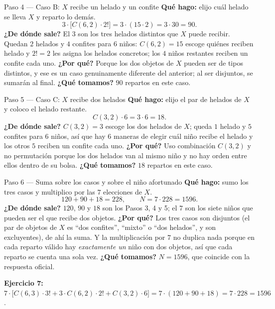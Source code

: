 \documentclass[11pt]{article}
\begin{document}
\begin{paso}{Paso 4 --- Caso B: $X$ recibe un helado y un confite}
\textbf{Qué hago:} elijo cuál helado se lleva $X$ y reparto lo demás.
\[
3\cdot\bigl[C(6,2)\cdot 2!\bigr]=3\cdot(15\cdot 2)=3\cdot 30=90 .
\]
\textbf{¿De dónde sale?} El $3$ son los tres helados distintos que $X$ puede recibir. Quedan $2$ helados y $4$ confites para $6$ niños: $C(6,2)=15$ escoge quiénes reciben helado y $2!=2$ les asigna los helados concretos; los $4$ niños restantes reciben un confite cada uno.
\textbf{¿Por qué?} Porque los dos objetos de $X$ pueden ser de tipos distintos, y ese es un caso genuinamente diferente del anterior; al ser disjuntos, se sumarán al final.
\textbf{¿Qué tomamos?} $90$ repartos en este caso.
\end{paso}

\begin{paso}{Paso 5 --- Caso C: $X$ recibe dos helados}
\textbf{Qué hago:} elijo el par de helados de $X$ y coloco el helado restante.
\[
C(3,2)\cdot 6=3\cdot 6=18 .
\]
\textbf{¿De dónde sale?} $C(3,2)=3$ escoge los dos helados de $X$; queda $1$ helado y $5$ confites para $6$ niños, así que hay $6$ maneras de elegir cuál niño recibe el helado y los otros $5$ reciben un confite cada uno.
\textbf{¿Por qué?} Uso combinación $C(3,2)$ y no permutación porque los dos helados van al mismo niño y no hay orden entre ellos dentro de su bolsa.
\textbf{¿Qué tomamos?} $18$ repartos en este caso.
\end{paso}

\begin{paso}{Paso 6 --- Suma sobre los casos y sobre el niño afortunado}
\textbf{Qué hago:} sumo los tres casos y multiplico por las $7$ elecciones de $X$.
\[
120+90+18=228,\qquad N=7\cdot 228=1596 .
\]
\textbf{¿De dónde sale?} $120$, $90$ y $18$ son los Pasos 3, 4 y 5; el $7$ son los siete niños que pueden ser el que recibe dos objetos.
\textbf{¿Por qué?} Los tres casos son disjuntos (el par de objetos de $X$ es ``dos confites'', ``mixto'' o ``dos helados'', y son excluyentes), de ahí la suma. Y la multiplicación por $7$ no duplica nada porque en cada reparto válido hay \emph{exactamente un} niño con dos objetos, así que cada reparto se cuenta una sola vez.
\textbf{¿Qué tomamos?} $N=1596$, que coincide con la respuesta oficial.
\end{paso}

\begin{resp}
\textbf{Ejercicio 7:} $7\cdot\bigl[C(6,3)\cdot 3!+3\cdot C(6,2)\cdot 2!+C(3,2)\cdot 6\bigr]=7\cdot(120+90+18)=7\cdot 228=1596$.
\end{resp}
\end{document}
